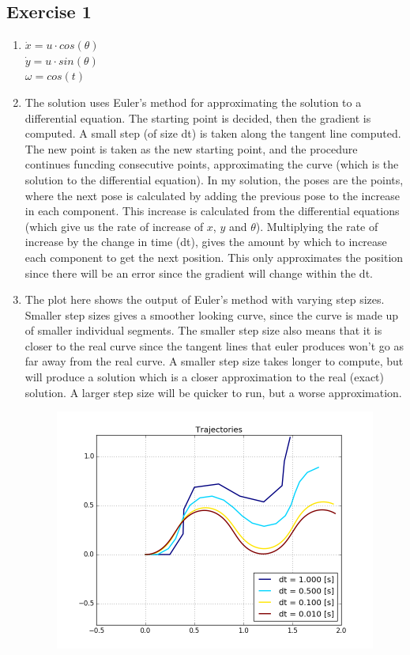 \documentclass[12pt,a4paper]{article}
\begin{document}
\subsection*{Exercise 1}
\begin{enumerate}[label=(\alph*)]
		\item $\dot{x} = u\cdot cos(\theta)$\\
	      $\dot{y} = u\cdot sin(\theta)$\\
	      $\omega = cos(t)$
        \item The solution uses Euler's method for approximating the solution to a differential equation. The starting point is decided, then the gradient is computed. A small step (of size dt) is taken along the tangent line computed. The new point is taken as the new starting point, and the procedure continues funcding consecutive points, approximating the curve (which is the solution to the differential equation). In my solution, the poses are the points, where the next pose is calculated by adding the previous pose to the increase in each component. This increase is calculated from the differential equations (which give us the rate of increase of $x$, $y$ and $\theta$). Multiplying the rate of increase by the change in time (dt), gives the amount by which to increase each component to get the next position. This only approximates the position since there will be an error since the gradient will change within the dt.
		\item The plot here shows the output of Euler's method with varying step sizes. Smaller step sizes gives a smoother looking curve, since the curve is made up of smaller individual segments. The smaller step size also means that it is closer to the real curve since the tangent lines that euler produces won't go as far away from the real curve.  A smaller step size takes longer to compute, but will produce a solution which is a closer approximation to the real (exact) solution. A larger step size will be quicker to run, but a worse approximation.
	      \begin{figure}[h!]
	      	\centering
	      	\includegraphics[width=\textwidth]{fig/1c.png}

\end{figure}
\end{enumerate}
\end{document}
